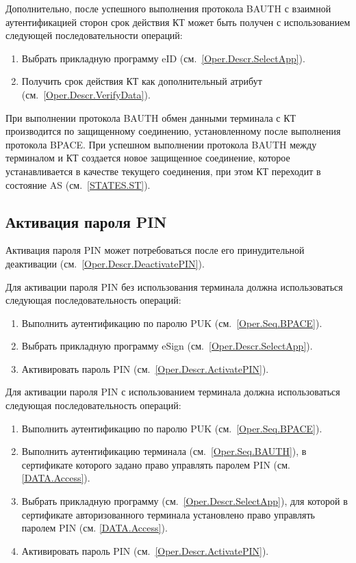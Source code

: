 Дополнительно, после успешного выполнения 
протокола BAUTH с взаимной аутентификацией сторон
срок действия КТ может быть получен с использованием
следующей последовательности операций:
%
\begin{enumerate}
\item Выбрать прикладную программу eID (см.~\ref{Oper.Descr.SelectApp}).
\item Получить срок действия КТ как дополнительный атрибут (см.~\ref{Oper.Descr.VerifyData}).
\end{enumerate}

При выполнении протокола BAUTH обмен данными терминала с КТ производится по 
защищенному соединению, установленному после выполнения протокола BPACE. 
При успешном выполнении протокола BAUTH между терминалом и КТ создается новое 
защищенное соединение, которое устанавливается в качестве текущего
соединения, при этом КТ переходит в состояние AS (см.~\ref{STATES.ST}).

\subsection{Активация пароля PIN}
\label{Oper.Seq.ActivatePIN}

Активация пароля PIN может потребоваться после его
принудительной деактивации (см.~\ref{Oper.Descr.DeactivatePIN}).

Для активации пароля PIN без использования терминала
должна использоваться следующая последовательность операций:
%
\begin{enumerate}
\item Выполнить аутентификацию по паролю PUK (см.~\ref{Oper.Seq.BPACE}).

\item Выбрать прикладную программу eSign (см.~\ref{Oper.Descr.SelectApp}).

\item Активировать пароль PIN (см.~\ref{Oper.Descr.ActivatePIN}).

\end{enumerate}

Для активации пароля PIN с использованием терминала
должна использоваться следующая последовательность операций:

\begin{enumerate}
\item Выполнить аутентификацию по паролю PUK (см.~\ref{Oper.Seq.BPACE}).

\item Выполнить аутентификацию терминала (см.~\ref{Oper.Seq.BAUTH}), 
в сертификате которого задано право управлять паролем PIN (см. \ref{DATA.Access}).

\item Выбрать прикладную программу  (см.~\ref{Oper.Descr.SelectApp}), 
для которой в сертификате авторизованного терминала установлено 
право управлять паролем PIN (см. \ref{DATA.Access}).

\item Активировать пароль PIN (см.~\ref{Oper.Descr.ActivatePIN}).

\end{enumerate}

